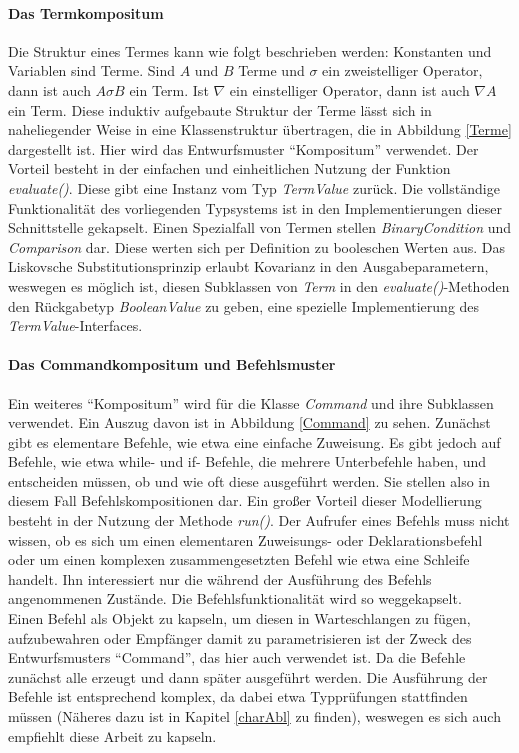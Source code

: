 \documentclass[parskip=full]{scrartcl}
\begin{document}
\paragraph{Das Termkompositum}
Die Struktur eines Termes kann wie folgt beschrieben werden:
Konstanten und Variablen sind Terme. Sind $A$ und $B$ Terme und $\sigma$ ein zweistelliger Operator, dann ist auch $A\sigma B$ ein Term. Ist $\nabla$ ein einstelliger Operator, dann ist auch $\nabla A$ ein Term. Diese induktiv aufgebaute Struktur der Terme lässt sich in naheliegender Weise in eine Klassenstruktur übertragen, die in Abbildung \ref{Terme} dargestellt ist. Hier wird das Entwurfsmuster \enquote{Kompositum} verwendet. Der Vorteil besteht in der einfachen und einheitlichen Nutzung der Funktion \textit{evaluate()}. Diese gibt eine Instanz vom Typ \textit{TermValue} zurück. Die vollständige Funktionalität des vorliegenden Typsystems ist in den Implementierungen dieser Schnittstelle gekapselt. Einen Spezialfall von Termen stellen \textit{BinaryCondition} und \textit{Comparison} dar. Diese werten sich per Definition zu booleschen Werten aus. Das Liskovsche Substitutionsprinzip erlaubt Kovarianz in den Ausgabeparametern, weswegen es möglich ist, diesen Subklassen von \textit{Term} in den \textit{evaluate()}-Methoden den Rückgabetyp \textit{BooleanValue} zu geben, eine spezielle Implementierung des \textit{TermValue}-Interfaces.
\paragraph{Das Commandkompositum und Befehlsmuster}
Ein weiteres \enquote{Kompositum} wird für die Klasse \textit{Command} und ihre Subklassen verwendet. Ein Auszug davon ist in Abbildung \ref{Command} zu sehen. Zunächst gibt es elementare Befehle, wie etwa eine einfache Zuweisung. Es gibt jedoch auf Befehle, wie etwa while- und if- Befehle, die mehrere Unterbefehle haben, und entscheiden müssen, ob und wie oft diese ausgeführt werden. Sie stellen also in diesem Fall Befehlskompositionen dar. Ein großer Vorteil dieser Modellierung besteht in der Nutzung der Methode \textit{run()}. Der Aufrufer eines Befehls muss nicht wissen, ob es sich um einen elementaren Zuweisungs- oder Deklarationsbefehl oder um einen komplexen zusammengesetzten Befehl wie etwa eine Schleife handelt. Ihn interessiert nur die während der Ausführung des Befehls angenommenen Zustände. Die Befehlsfunktionalität wird so weggekapselt. \\
Einen Befehl als Objekt zu kapseln, um diesen in Warteschlangen zu fügen, aufzubewahren oder Empfänger damit zu parametrisieren ist der Zweck des Entwurfsmusters \enquote{Command}, das hier auch verwendet ist. Da die Befehle zunächst alle erzeugt und dann später ausgeführt werden. Die Ausführung der Befehle ist entsprechend komplex, da dabei etwa Typprüfungen stattfinden müssen (Näheres dazu ist in Kapitel \ref{charAbl} zu finden), weswegen es sich auch empfiehlt diese Arbeit zu kapseln. 
\end{document}
